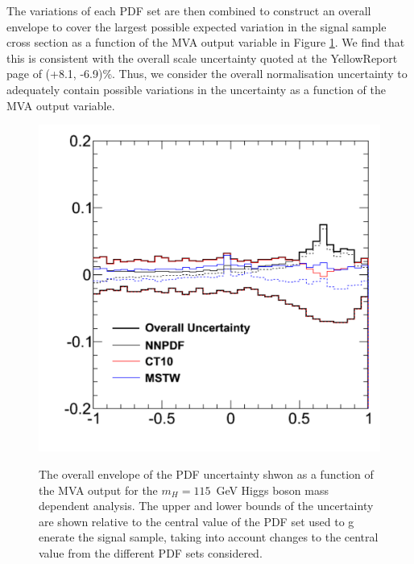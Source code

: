The variations of each PDF set are then combined to construct an overall envelope to
cover the largest possible expected variation in the signal sample cross section
as a function of the MVA output variable in Figure \ref{fig:appendix_signalshape_pdfenvelope}.
We find that this is consistent with the overall scale uncertainty quoted at the
YellowReport page of (+8.1, -6.9)\%.
Thus, we consider the overall normalisation uncertainty to adequately contain possible variations
in the uncertainty as a function of the MVA output variable.

\begin{figure}[!hbtp]\begin{center}
\label{fig:appendix_signalshape_pdfenvelope}
\includegraphics[width=.45\textwidth]{figures/nn_hww115_ww_envelope.pdf}
\caption{The overall envelope of the PDF uncertainty shwon as a function of the MVA output for the $m_H=115$~GeV Higgs boson mass
dependent analysis. The upper and lower bounds of the uncertainty are shown relative to the central value of the PDF set used to g
enerate the signal sample, taking into account changes to the central value from the different PDF sets considered.}
\end{center}
\end{figure}

